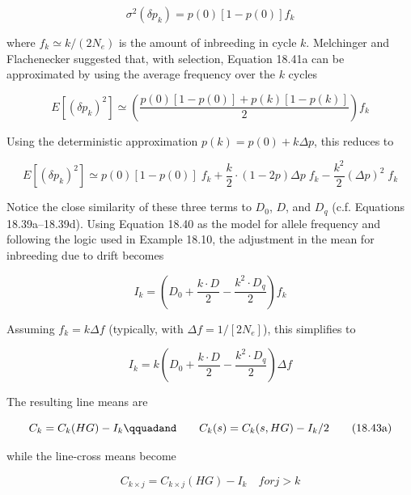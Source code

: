 \documentclass{article}
\begin{document}
\begin{equation}
\sigma^{2}(\delta p_{k})=p(0)[1-p(0)]f_{k}
\tag{18.41a}
\label{eq:18_41a}
\end{equation}

where  $ f_k \simeq k/(2N_e) $ is the amount of inbreeding in cycle  $ k $. Melchinger and Flachenecker suggested that, with selection, Equation 18.41a can be approximated by using the average frequency over the  $ k $ cycles

\begin{equation}
E[(\delta p_{k})^{2}]\simeq\left(\frac{p(0)[1-p(0)]+p(k)[1-p(k)]}{2}\right)f_{k}
\tag{18.41b}
\label{eq:18_41b}
\end{equation}

Using the deterministic approximation  $ p(k) = p(0) + k\Delta p $, this reduces to

\begin{equation}
E[\left(\delta p_{k}\right)^{2}]\simeq p(0)[1-p(0)]\;f_{k}+\frac{k}{2}\cdot(1-2p)\Delta p\;f_{k}-\frac{k^{2}}{2}\left(\Delta p\right)^{2}\;f_{k}
\tag{18.41c}
\label{eq:18_41c}
\end{equation}

Notice the close similarity of these three terms to  $ D_{0} $,  $ D $, and  $ D_{q} $ (c.f. Equations 18.39a–18.39d). Using Equation 18.40 as the model for allele frequency and following the logic used in Example 18.10, the adjustment in the mean for inbreeding due to drift becomes

\begin{equation}
I_{k}=\left(D_{0}+\frac{k\cdot D}{2}-\frac{k^{2}\cdot D_{q}}{2}\right)f_{k}
\tag{18.42a}
\label{eq:18_42a}
\end{equation}

Assuming  $ f_k = k \Delta f $ (typically, with  $ \Delta f = 1/[2N_e] $), this simplifies to

\begin{equation}
I_{k}=k\left(D_{0}+\frac{k\cdot D}{2}-\frac{k^{2}\cdot D_{q}}{2}\right)\Delta f
\tag{18.42b}
\label{eq:18_42b}
\end{equation}

The resulting line means are

\begin{equation}
C_{k}=C_{k}(HG)-I_{k}\qquadand\qquad C_{k}(s)=C_{k}(s,HG)-I_{k}/2
\tag{18.43a}
\label{eq:18_43a}
\end{equation}

while the line-cross means become

\begin{equation}
C_{k\times j}=C_{k\times j}(HG)-I_{k}\quad for j>k
\tag{18.43b}
\label{eq:18_43b}
\end{equation}
\end{document}
